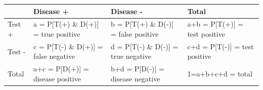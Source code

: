 \documentclass[
]{article}
\begin{document}
\begin{longtable}[]{@{}llll@{}}
\toprule
\begin{minipage}[b]{0.06\columnwidth}\raggedright
\strut
\end{minipage} & \begin{minipage}[b]{0.29\columnwidth}\raggedright
Disease +\strut
\end{minipage} & \begin{minipage}[b]{0.29\columnwidth}\raggedright
Disease -\strut
\end{minipage} & \begin{minipage}[b]{0.24\columnwidth}\raggedright
Total\strut
\end{minipage}\tabularnewline
\midrule
\endhead
\begin{minipage}[t]{0.06\columnwidth}\raggedright
Test +\strut
\end{minipage} & \begin{minipage}[t]{0.29\columnwidth}\raggedright
a = P{[}T(+) \& D(+){]} = true positive\strut
\end{minipage} & \begin{minipage}[t]{0.29\columnwidth}\raggedright
b = P{[}T(+) \& D(-){]} = false positive\strut
\end{minipage} & \begin{minipage}[t]{0.24\columnwidth}\raggedright
a+b = P{[}T(+){]} = test positive\strut
\end{minipage}\tabularnewline
\begin{minipage}[t]{0.06\columnwidth}\raggedright
Test -\strut
\end{minipage} & \begin{minipage}[t]{0.29\columnwidth}\raggedright
c = P{[}T(-) \& D(+){]} = false negative\strut
\end{minipage} & \begin{minipage}[t]{0.29\columnwidth}\raggedright
d = P{[}T(-) \& D(-){]} = true negative\strut
\end{minipage} & \begin{minipage}[t]{0.24\columnwidth}\raggedright
c+d = P{[}T(-){]} = test positive\strut
\end{minipage}\tabularnewline
\begin{minipage}[t]{0.06\columnwidth}\raggedright
Total\strut
\end{minipage} & \begin{minipage}[t]{0.29\columnwidth}\raggedright
a+c = P{[}D(+){]} = disease positive\strut
\end{minipage} & \begin{minipage}[t]{0.29\columnwidth}\raggedright
b+d = P{[}D(-){]} = disease negative\strut
\end{minipage} & \begin{minipage}[t]{0.24\columnwidth}\raggedright
1=a+b+c+d = total\strut
\end{minipage}\tabularnewline
\bottomrule
\end{longtable}
\end{document}
